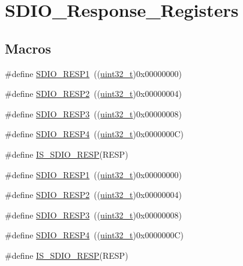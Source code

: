 \hypertarget{group___s_d_i_o___response___registers}{}\section{S\+D\+I\+O\+\_\+\+Response\+\_\+\+Registers}
\label{group___s_d_i_o___response___registers}
\subsection*{Macros}
\begin{DoxyCompactItemize}
\item 
\#define \hyperlink{group___s_d_i_o___response___registers_ga9d78943952cf0e36736313d949520a2d}{S\+D\+I\+O\+\_\+\+R\+E\+S\+P1}~((\hyperlink{_p_e___types_8h_a33594304e786b158f3fb30289278f5af}{uint32\+\_\+t})0x00000000)
\item 
\#define \hyperlink{group___s_d_i_o___response___registers_gabd551272af4161844b5358fd3c3c379c}{S\+D\+I\+O\+\_\+\+R\+E\+S\+P2}~((\hyperlink{_p_e___types_8h_a33594304e786b158f3fb30289278f5af}{uint32\+\_\+t})0x00000004)
\item 
\#define \hyperlink{group___s_d_i_o___response___registers_gae9887669a72395d54d600829a959d2f4}{S\+D\+I\+O\+\_\+\+R\+E\+S\+P3}~((\hyperlink{_p_e___types_8h_a33594304e786b158f3fb30289278f5af}{uint32\+\_\+t})0x00000008)
\item 
\#define \hyperlink{group___s_d_i_o___response___registers_ga57c3f6414198e5497736e398c02a1d9e}{S\+D\+I\+O\+\_\+\+R\+E\+S\+P4}~((\hyperlink{_p_e___types_8h_a33594304e786b158f3fb30289278f5af}{uint32\+\_\+t})0x0000000\+C)
\item 
\#define \hyperlink{group___s_d_i_o___response___registers_gaea6a7f75a5e677d50ba5c9ae2d3a7839}{I\+S\+\_\+\+S\+D\+I\+O\+\_\+\+R\+E\+SP}(R\+E\+SP)
\item 
\#define \hyperlink{group___s_d_i_o___response___registers_ga9d78943952cf0e36736313d949520a2d}{S\+D\+I\+O\+\_\+\+R\+E\+S\+P1}~((\hyperlink{_p_e___types_8h_a33594304e786b158f3fb30289278f5af}{uint32\+\_\+t})0x00000000)
\item 
\#define \hyperlink{group___s_d_i_o___response___registers_gabd551272af4161844b5358fd3c3c379c}{S\+D\+I\+O\+\_\+\+R\+E\+S\+P2}~((\hyperlink{_p_e___types_8h_a33594304e786b158f3fb30289278f5af}{uint32\+\_\+t})0x00000004)
\item 
\#define \hyperlink{group___s_d_i_o___response___registers_gae9887669a72395d54d600829a959d2f4}{S\+D\+I\+O\+\_\+\+R\+E\+S\+P3}~((\hyperlink{_p_e___types_8h_a33594304e786b158f3fb30289278f5af}{uint32\+\_\+t})0x00000008)
\item 
\#define \hyperlink{group___s_d_i_o___response___registers_ga57c3f6414198e5497736e398c02a1d9e}{S\+D\+I\+O\+\_\+\+R\+E\+S\+P4}~((\hyperlink{_p_e___types_8h_a33594304e786b158f3fb30289278f5af}{uint32\+\_\+t})0x0000000\+C)
\item 
\#define \hyperlink{group___s_d_i_o___response___registers_gaea6a7f75a5e677d50ba5c9ae2d3a7839}{I\+S\+\_\+\+S\+D\+I\+O\+\_\+\+R\+E\+SP}(R\+E\+SP)
\end{DoxyCompactItemize}


